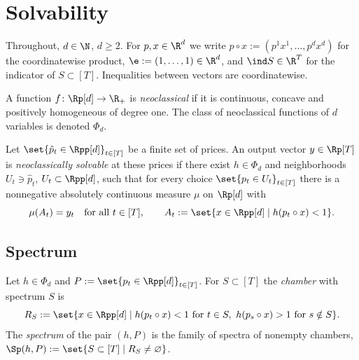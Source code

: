 \section{Solvability}\label{sec:solvability}


Throughout, $d\in\N$, $d\ge2$. For $p,x\in\R^d$ we write $p\circ x:=(p^1x^1,\dots,p^dx^d)$ for the coordinatewise product, $\e:=(1,\dots,1)\in\R^d$, and $\ind S\in\R^T$ for the indicator of $S\subset[T]$. Inequalities between vectors are coordinatewise.

\begin{definition}\label{def:neoclassical}
A function $f\colon\Rp[d]\to\R_+$ is \emph{neoclassical} if it is continuous, concave and positively homogeneous of degree one. The class of neoclassical functions of $d$ variables is denoted $\Phi_d$.
\end{definition}

\begin{definition}\label{def:neo-solvability}
Let $\set{\hat p_t\in\Rpp[d]}_{t\in[T]}$ be a finite set of prices. An output vector $y\in\Rp[T]$ is \emph{neoclassically solvable} at these prices if there exist $h\in\Phi_d$ and neighborhoods $U_t\ni\hat p_t$, $U_t\subset\Rpp[d]$, such that for every choice $\set{p_t\in U_t}_{t\in[T]}$ there is a nonnegative absolutely continuous measure $\mu$ on $\Rp[d]$ with
\[
\mu(A_t)=y_t\quad\text{for all }t\in[T],\qquad A_t:=\set{x\in\Rpp[d]\mid h(p_t\circ x)<1}.
\]
\end{definition}

\subsection{Spectrum}

\begin{definition}[spectrum]\label{def:spectrum}
Let $h\in\Phi_d$ and $P:=\set{p_t\in\Rpp[d]}_{t\in[T]}$. For $S\subset[T]$ the \emph{chamber} with spectrum $S$ is
\[
R_S:=\set{x\in\Rpp[d]\mid h(p_t\circ x)<1\text{ for }t\in S,\ h(p_s\circ x)>1\text{ for }s\notin S}.
\]
The \emph{spectrum} of the pair $(h,P)$ is the family of spectra of nonempty chambers, $\Sp(h,P):=\set{S\subset[T]\mid R_S\ne\varnothing}$.
\end{definition}

